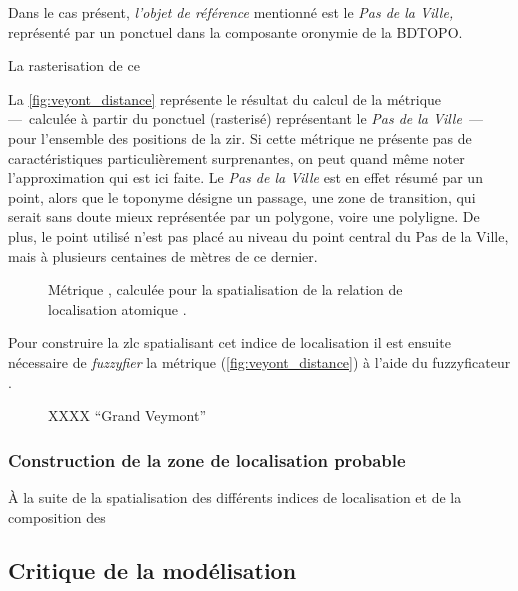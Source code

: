Dans le cas présent, \emph{l'objet de référence} mentionné est le
\emph{Pas de la Ville,} représenté par un ponctuel dans la composante
oronymie de la BDTOPO.


La rasterisation de ce



La \autoref{fig:veyont_distance} représente le résultat du calcul de
la métrique  ---~calculée à partir du ponctuel
(rasterisé) représentant le \emph{Pas de la Ville}~--- pour l'ensemble
des positions de la \ac{zir}. Si cette métrique ne présente pas de
caractéristiques particulièrement surprenantes, on peut quand même
noter l'approximation qui est ici faite. Le \emph{Pas de la Ville} est
en effet résumé par un point, alors que le toponyme désigne un
passage, une zone de transition, qui serait sans doute mieux
représentée par un polygone, voire une polyligne. De plus, le point
utilisé n'est pas placé au niveau du point central du Pas de la Ville,
mais à plusieurs centaines de mètres de ce dernier.


\begin{figure}
  \centering
  
  \caption{Métrique \protect{}, calculée pour la
    spatialisation de la relation de localisation atomique
    \protect{}.}
  \label{fig:veyont_distance}
\end{figure}

Pour construire la \ac{zlc} spatialisant cet indice de localisation il
est ensuite nécessaire de \emph{fuzzyfier} la métrique
(\autoref{fig:veyont_distance}) à l'aide du fuzzyficateur
.

\begin{figure}
  \centering
  
  \caption{XXXX \enquote{Grand Veymont}}
  \label{fig:fuzzy_veyont_distance}
\end{figure}


\subsubsection{Construction de la zone de localisation probable}

À la suite de la spatialisation des différents indices de localisation
et de la composition des 

\subsection{Critique de la modélisation}
\label{subsec:9-2-3}

